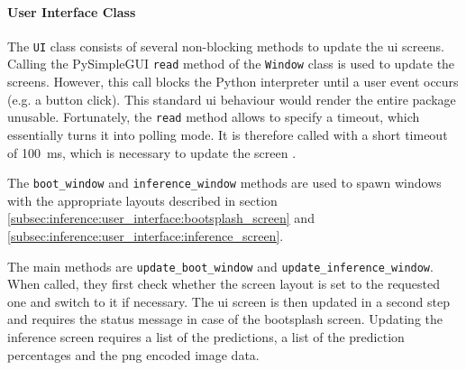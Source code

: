 \paragraph{User Interface Class}
The \texttt{UI} class consists of several non-blocking methods to update the \acrlong{ui} screens.
Calling the PySimpleGUI \texttt{read} method of the \texttt{Window} class is used to update the screens.
However, this call blocks the Python interpreter until a user event occurs (e.g. a button click).
This standard \acrlong{ui} behaviour would render the entire package unusable.
Fortunately, the \texttt{read} method allows to specify a timeout, which essentially turns it into polling mode.
It is therefore called with a short timeout of \SI{100}{ms}, which is necessary to update the screen \cite{}. %

The \texttt{boot\_window} and \texttt{inference\_window} methods are used to spawn windows with the appropriate layouts described in section \ref{subsec:inference:user_interface:bootsplash_screen} and \ref{subsec:inference:user_interface:inference_screen}.

The main methods are \texttt{update\_boot\_window} and \texttt{update\_inference\_window}.
When called, they first check whether the screen layout is set to the requested one and switch to it if necessary.
The \acrlong{ui} screen is then updated in a second step and requires the status message in case of the bootsplash screen.
Updating the inference screen requires a list of the predictions, a list of the prediction percentages and the \acrshort{png} encoded image data.

